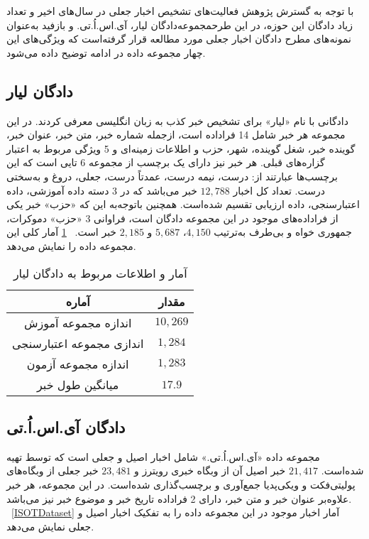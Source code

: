 با توجه به گسترش پژوهش فعالیت‌های تشخیص اخبار جعلی در سال‌های اخیر و تعداد زیاد دادگان این حوزه، در این طرحمجموعه‌دادگان لیار، آی.اس.اُ.تی. و بازفید به‌عنوان نمونه‌های مطرح دادگان اخبار جعلی مورد مطالعه قرار گرفته‌است که ویژگی‌های این چهار مجموعه داده در ادامه توضیح داده می‌شود.

\subsection{دادگان لیار}

\noindent \citet{wang2017liar} دادگانی با نام «لیار» برای تشخیص خبر کذب به زبان انگلیسی معرفی کردند. در این مجموعه هر خبر شامل 14 فراداده است، ازجمله شماره خبر، متن خبر، عنوان خبر، گوینده خبر، شغل گوینده، شهر، حزب و اطلاعات زمینه‌ای و 5 ویژگی مربوط به اعتبار گزاره‌های قبلی. هر خبر نیز دارای یک برچسب از مجموعه 6 تایی است که این برچسب‌ها عبارتند از: درست، نیمه درست، عمدتاً درست، جعلی، دروغ و به‌سختی درست. تعداد کل اخبار $12,788$ خبر می‌باشد که در 3 دسته داده آموزشی، داده اعتبارسنجی، داده ارزیابی تقسیم شده‌است. همچنین باتوجه‌به این که «حزب» خبر یکی از فراداده‌های موجود در این مجموعه دادگان است، فراوانی 3 «حزب» دموکرات، جمهوری خواه و بی‌طرف به‌ترتیب 
$4,150$، $5,687$ و $2,185$ 
خبر است.
\tablename~\ref{liarDataset} آمار کلی این مجموعه داده را نمایش می‌دهد.

\begin{table}[!h]
\caption{آمار و اطلاعات مربوط به دادگان لیار}
\label{liarDataset}
\begin{center}
\begin{tabular}{|c|c|}
\hline
\textbf{آماره} & \textbf{مقدار} \\
\hline
اندازه مجموعه آموزش
&   $10,269$  \\
\hline
 اندازی مجموعه اعتبارسنجی
 & $1,284$  \\
\hline
  اندازه مجموعه آزمون
  & $1,283$ \\
\hline
 میانگین طول خبر
 & $17.9$  \\
\hline

\end{tabular}
\end{center}
\end{table}


\subsection{دادگان آی.اس.اُ.تی}
مجموعه داده «آی.اس.اُ.تی.» شامل اخبار اصیل و جعلی است که توسط \citet{ahmed2017detection} تهیه شده‌است.
$21,417$ خبر اصیل آن از وبگاه خبری رویترز و $23,481$ خبر جعلی از وبگاه‌های پولیتی‌فکت و ویکی‌پدیا جمع‌آوری و برچسب‌گذاری شده‌است. در این مجموعه، هر خبر علاوه‌بر عنوان خبر و متن خبر، دارای 2  فراداده تاریخ خبر و موضوع خبر نیز 
می‌باشد. \tablename~\ref{ISOTDataset} آمار اخبار موجود در این مجموعه داده را به تفکیک اخبار اصیل و جعلی نمایش می‌دهد.

